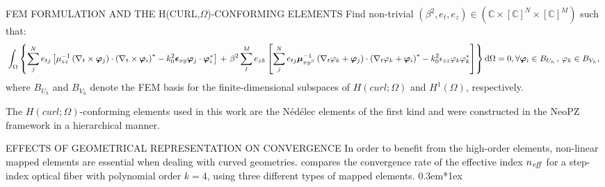 \documentclass[debug]{beamer} %
\def\\{ }%
\def\vspace{0.3em}{ }%
\newcommand{\hcurl}[1]{H (curl;#1)}
\newcommand{\hone}[1]{H^1(#1)}
\newcommand{\testhcurl}[0]{\bm{\varphi}}
\newcommand{\testhone}[0]{\varphi}
\begin{document}
\begin{frame}
\begin{minipage}[t]{0.45\textwidth}
\begin{block}{\boxnumber FEM FORMULATION AND THE \texorpdfstring{H(CURL,$\Omega$)}{H(CURL,OMEGA)}-CONFORMING ELEMENTS}
	        Find non-trivial $\left(\beta^2,{e_t}, {e_z}\right) \in (\mathbb{C} \times [\mathbb{C}]^N \times [\mathbb{C}]^M)$ such that:
			\begin{equation}
				\renewcommand{\arraystretch}{1.5}%
	  			 \scalebox{0.9}{%
					$\begin{multlined}\label{eq:fem-hcurl-disc-1}
					    \int_\Omega\left\{\sum_{j}^Ne_{tj}\left[\mu_{zz}^{-1} \left( \nabla_t \times \testhcurl_j \right)\cdot \left( \nabla_t \times \testhcurl_i \right)^*- k_0^2 \bm{\epsilon}_{xy}\testhcurl_j\cdot\testhcurl_i^*\right]\right.\\
					     +\left.\beta^2\sum_{l}^M e_{zk} \left[ \sum_{j}^Ne_{tj} \bm{\mu}_{xy^S}^{-1} \left( \nabla_t \testhone_k +\testhcurl_j \right)\cdot \left(\nabla_t \testhone_k +\testhcurl_i \right)^*-k_0^2\epsilon_{zz} \testhone_k\testhone_k^*\right]\right\}\mathrm{d}\Omega = 0,\\
					     \forall \testhcurl_i \in B_{U_h}\,,\, \testhone_k \in B_{V_h}\text{,}
					\end{multlined}$
				}
			\end{equation}%
			where $B_{U_h}$ and $B_{V_h}$ denote the FEM basis for the finite-dimensional subspaces of $\hcurl{\Omega}$ and $\hone{\Omega}$, respectively.

			The $\hcurl{\Omega}$-conforming elements used in this work are the Nédélec elements of the first kind\parencite{nedelec80} and were constructed in the NeoPZ framework in a hierarchical manner.
        \end{block}

        \vfill
        \begin{block}{\boxnumber EFFECTS OF GEOMETRICAL REPRESENTATION ON CONVERGENCE}
        	In order to benefit from the high-order elements, non-linear mapped elements are essential when dealing with curved geometries.  compares the convergence rate of the effective index $n_{\text{\emph{eff}}}$ for a step-index optical fiber with polynomial order $k=4$, using three different types of mapped elements.
        	\vspace*{1ex}


\end{block}
\end{minipage}
\end{frame}
\end{document}
